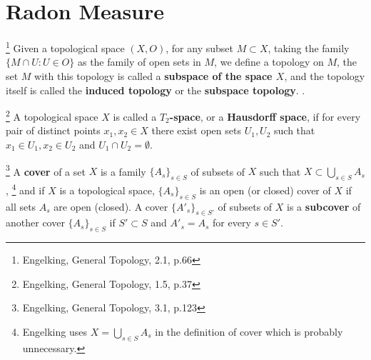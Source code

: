\section{Radon Measure}

\begin{definition}
\footnote{Engelking, General Topology, 2.1, p.66}
Given a topological space $(X,O)$, for any subset $M\subset X$, taking the 
family $\{M\cap U: U\in O\}$ as the family of open sets in $M$, we define a
topology on $M$, the set $M$ with this topology is called a
\textbf{subspace of the space $X$}, 
and the topology itself is called the \textbf{induced topology} or the
\textbf{subspace topology}.
.
\end{definition}

\begin{definition} \label{D:haus}
\footnote{Engelking, General Topology, 1.5, p.37}
A topological space $X$ is called a 
\textbf{$T_2$-space}, 
or a 
\textbf{Hausdorff space}, 
if for every pair of distinct points $x_1,x_2\in X$
there exist open sets $U_1,U_2$ such that $x_1\in U_1, x_2\in U_2$ and 
$U_1\cap U_2=\emptyset$.
\end{definition}

\begin{definition}
\footnote{Engelking, General Topology, 3.1, p.123}
A \textbf{cover}
of a set $X$ is a family $\{A_s\}_{s\in S}$ of subsets of $X$ such that
$X\subset\bigcup_{s\in S} A_s$,
\footnote{Engelking uses $X=\bigcup_{s\in S} A_s$ in the definition of cover
    which is probably unnecessary.}
and if $X$ is a topological space, $\{A_s\}_{s\in S}$
is an open (or closed) cover of $X$ if all sets $A_s$ are open (closed).
A cover $\{A'_s\}_{s\in S'}$ of subsets of $X$ is a \textbf{subcover}
of another cover $\{A_s\}_{s\in S}$ if $S'\subset S$ and $A'_s=A_s$ for every
$s\in S'$.
\end{definition}

